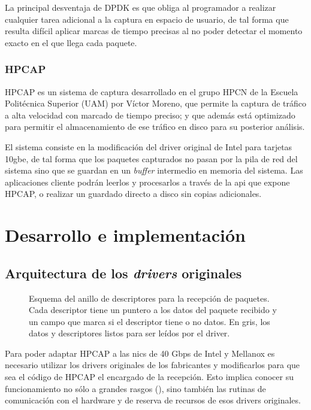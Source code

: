 \documentclass[oneside, draft]{epstfg}
\begin{document}
La principal desventaja de DPDK es que obliga al programador a realizar cualquier tarea adicional a la captura en espacio de usuario, de tal forma que resulta difícil aplicar marcas de tiempo precisas al no poder detectar el momento exacto en el que llega cada paquete.

\subsection{HPCAP}

HPCAP \cite{victorPhD} es un sistema de captura desarrollado en el grupo HPCN de la Escuela Politécnica Superior (UAM) por Víctor Moreno, que permite la captura de tráfico a alta velocidad con marcado de tiempo preciso; y que además está optimizado para permitir el almacenamiento de ese tráfico en disco para su posterior análisis.

El sistema consiste en la modificación del \gls{driver} original de Intel para tarjetas \gls{10gbe}, de tal forma que los paquetes capturados no pasan por la pila de red del sistema sino que se guardan en un \textit{buffer} intermedio en memoria del sistema. Las aplicaciones cliente podrán leerlos y procesarlos a través de la \gls{api} que expone HPCAP, o realizar un guardado directo a disco sin copias adicionales.

\chapter{Desarrollo e implementación}

\section{Arquitectura de los \textit{drivers} originales}
\label{sec:ArquitecturaOriginal}

\begin{figure}[btp]
\centering

\caption[Esquema del anillo de descriptores para recepción de paquetes]{Esquema del anillo de descriptores para la recepción de paquetes. Cada descriptor tiene un puntero a los datos del paquete recibido y un campo que marca si el descriptor tiene o no datos. En gris, los datos y descriptores listos para ser leídos por el \gls{driver}.}
\label{fig:DriverRings}
\end{figure}

Para poder adaptar HPCAP a las \glspl{nic} de 40 Gbps de Intel y Mellanox es necesario utilizar los \glspl{driver} originales de los fabricantes y modificarlos para que sea el código de HPCAP el encargado de la recepción. Esto implica conocer su funcionamiento no sólo a grandes rasgos (), sino también las rutinas de comunicación con el hardware y de reserva de recursos de esos \glspl{driver} originales.
\end{document}

